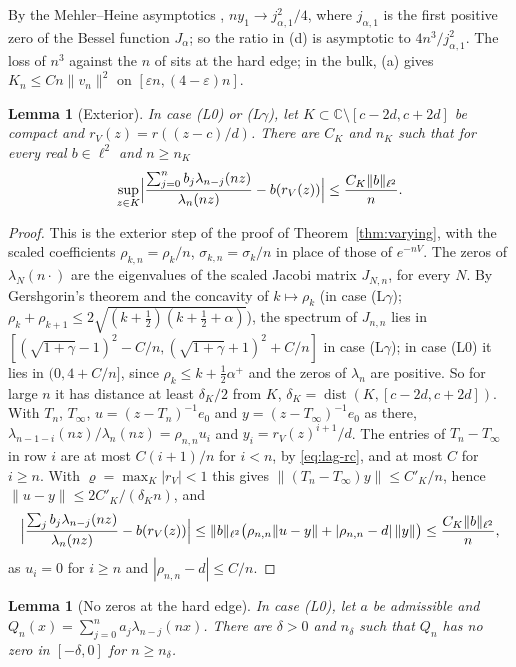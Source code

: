 \documentclass[11pt]{amsart}
\newtheorem{lemma}[theorem]{Lemma}
\theoremstyle{definition}
\theoremstyle{remark}
\numberwithin{equation}{section}
\newcommand{\C}{\mathbb{C}}
\newcommand{\eps}{\varepsilon}
\DeclareMathOperator{\dist}{dist}
\begin{document}
By the Mehler--Heine asymptotics \cite[Theorem~8.1.3]{Sz}, $ny_1\to j_{\alpha,1}^2/4$, where $j_{\alpha,1}$ is the first positive zero of the Bessel function $J_\alpha$; so the ratio in (d) is asymptotic to $4n^3/j_{\alpha,1}^2$. The loss of $n^3$ against the $n$ of \cite[Lemma~\ref{M-lem:cd}]{Main} sits at the hard edge; in the bulk, (a) gives $K_n\le Cn\|v_n\|^2$ on $[\eps n,(4-\eps)n]$.

\begin{lemma}[Exterior]\label{lem:lag-exterior}
In case (L0) or (L$\gamma$), let $K\subset\C\setminus[c-2d,c+2d]$ be compact and $r_V(z)=r((z-c)/d)$. There are $C_K$ and $n_K$ such that for every real $b\in\ell^2$ and $n\ge n_K$
\[
\sup_{z\in K}\Bigl|\frac{\sum_{j=0}^{n}b_j\lambda_{n-j}(nz)}{\lambda_n(nz)}-b(r_V(z))\Bigr|\le\frac{C_K\|b\|_{\ell^2}}n .
\]
\end{lemma}

\begin{proof}
This is the exterior step of the proof of Theorem~\ref{thm:varying}, with the scaled coefficients $\rho_{k,n}=\rho_k/n$, $\sigma_{k,n}=\sigma_k/n$ in place of those of $e^{-nV}$. The zeros of $\lambda_N(n\cdot)$ are the eigenvalues of the scaled Jacobi matrix $J_{N,n}$, for every $N$. By Gershgorin's theorem and the concavity of $k\mapsto\rho_k$ (in case (L$\gamma$); $\rho_k+\rho_{k+1}\le2\sqrt{(k+\frac12)(k+\frac12+\alpha)}$), the spectrum of $J_{n,n}$ lies in $[(\sqrt{1+\gamma}-1)^2-C/n,(\sqrt{1+\gamma}+1)^2+C/n]$ in case (L$\gamma$); in case (L0) it lies in $(0,4+C/n]$, since $\rho_k\le k+\frac12\alpha^+$ and the zeros of $\lambda_n$ are positive. So for large $n$ it has distance at least $\delta_K/2$ from $K$, $\delta_K=\dist(K,[c-2d,c+2d])$. With $T_n$, $T_\infty$, $u=(z-T_n)^{-1}e_0$ and $y=(z-T_\infty)^{-1}e_0$ as there, $\lambda_{n-1-i}(nz)/\lambda_n(nz)=\rho_{n,n}u_i$ and $y_i=r_V(z)^{i+1}/d$. The entries of $T_n-T_\infty$ in row $i$ are at most $C(i+1)/n$ for $i<n$, by \eqref{eq:lag-rc}, and at most $C$ for $i\ge n$. With $\varrho=\max_K|r_V|<1$ this gives $\|(T_n-T_\infty)y\|\le C'_K/n$, hence $\|u-y\|\le2C'_K/(\delta_Kn)$, and
\[
\Bigl|\frac{\sum_jb_j\lambda_{n-j}(nz)}{\lambda_n(nz)}-b(r_V(z))\Bigr|\le\|b\|_{\ell^2}\bigl(\rho_{n,n}\|u-y\|+|\rho_{n,n}-d|\,\|y\|\bigr)\le\frac{C_K\|b\|_{\ell^2}}n ,
\]
as $u_i=0$ for $i\ge n$ and $|\rho_{n,n}-d|\le C/n$.
\end{proof}

\begin{lemma}[No zeros at the hard edge]\label{lem:lag-edge}
In case (L0), let $a$ be admissible and $Q_n(x)=\sum_{j=0}^{n}a_j\lambda_{n-j}(nx)$. There are $\delta>0$ and $n_\delta$ such that $Q_n$ has no zero in $[-\delta,0]$ for $n\ge n_\delta$.
\end{lemma}
\end{document}
